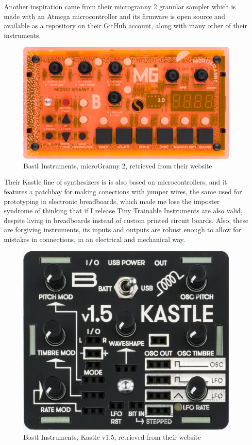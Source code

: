 Another inspiration came from their microgranny 2 granular sampler which is made with an Atmega microcontroller and its firmware is open source and available as a repository on their GitHub account, along with many other of their instruments.

\begin{figure}[h]
  \centering
  \includegraphics[width=0.75\linewidth,height=0.25\textheight,keepaspectratio]{images/bastl-microgranny-2.jpg}
  \caption{Bastl Instruments, microGranny 2, retrieved from their website}
  \label{fig:bastl-microgranny-2}
\end{figure}

Their Kastle line of synthesizers is is also based on microcontrollers, and it features a patchbay for making conections with jumper wires, the same used for prototyping in electronic breadboards, which made me lose the imposter syndrome of thinking that if I release Tiny Trainable Instruments are also valid, despite living in breadboards instead of custom printed circuit boards. Also, these are forgiving instruments, its inputs and outputs are robust enough to allow for mistakes in connections, in an electrical and mechanical way.

\begin{figure}[h]
  \centering
  \includegraphics[width=0.75\linewidth,height=0.25\textheight,keepaspectratio]{images/bastl-kastle-v15.jpg}
  \caption{Bastl Instruments, Kastle v1.5, retrieved from their website}
  \label{fig:bastl-kastle-v15}
\end{figure}

